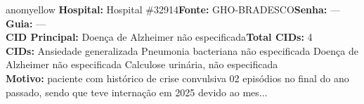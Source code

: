 \documentclass[a4paper,10pt]{article}
\begin{document}
\begin{anomalycard}[Interna\c{c}\~{a}o \#119850 | Pac. \#99396 | MODERADO (z=2.46) | LOS: 4d | 01/03/2026\,$\to$\,05/03/2026]{anomyellow}
\textbf{Hospital:} Hospital \#32914\quad \textbf{Fonte:} GHO-BRADESCO\quad \textbf{Senha:} ---\quad \textbf{Guia:} ---\\

\textbf{CID Principal:} {\small Doença de Alzheimer não especificada}\quad\textbf{Total CIDs:} 4\\

\textbf{CIDs:} {\scriptsize Ansiedade generalizada \textbar{} Pneumonia bacteriana não especificada \textbar{} Doença de Alzheimer não especificada \textbar{} Calculose urinária, não especificada}\\

\textbf{Motivo:} {\scriptsize paciente com histórico  de crise convulsiva  02 episódios no final do ano passado, sendo que teve internação em 2025 devido ao mes...}\\




\end{anomalycard}
\end{document}

